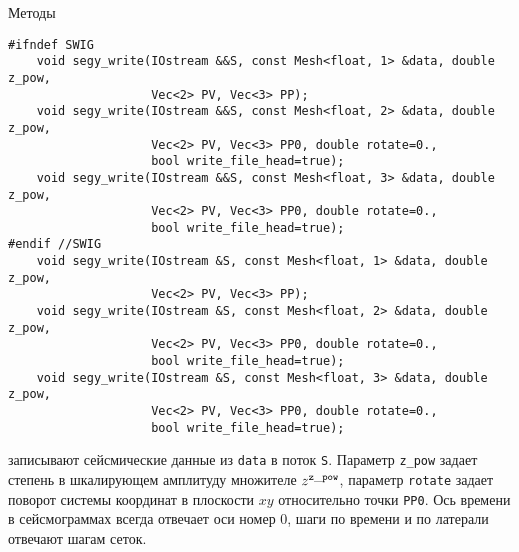 Методы
\begin{verbatim}
#ifndef SWIG
    void segy_write(IOstream &&S, const Mesh<float, 1> &data, double z_pow, 
                    Vec<2> PV, Vec<3> PP);
    void segy_write(IOstream &&S, const Mesh<float, 2> &data, double z_pow, 
                    Vec<2> PV, Vec<3> PP0, double rotate=0., 
                    bool write_file_head=true);
    void segy_write(IOstream &&S, const Mesh<float, 3> &data, double z_pow, 
                    Vec<2> PV, Vec<3> PP0, double rotate=0., 
                    bool write_file_head=true);
#endif //SWIG 
    void segy_write(IOstream &S, const Mesh<float, 1> &data, double z_pow, 
                    Vec<2> PV, Vec<3> PP);
    void segy_write(IOstream &S, const Mesh<float, 2> &data, double z_pow, 
                    Vec<2> PV, Vec<3> PP0, double rotate=0., 
                    bool write_file_head=true);
    void segy_write(IOstream &S, const Mesh<float, 3> &data, double z_pow, 
                    Vec<2> PV, Vec<3> PP0, double rotate=0., 
                    bool write_file_head=true);
\end{verbatim}
записывают сейсмические данные из \verb'data' в поток \verb'S'. Параметр \verb'z_pow' задает степень в шкалирующем амплитуду множителе $z^{\tt z\_pow}$,
параметр \verb'rotate' задает поворот системы координат в плоскости $xy$ относительно точки \verb'PP0'.
Ось времени в сейсмограммах всегда отвечает оси номер 0, шаги по времени и по латерали отвечают шагам сеток.

